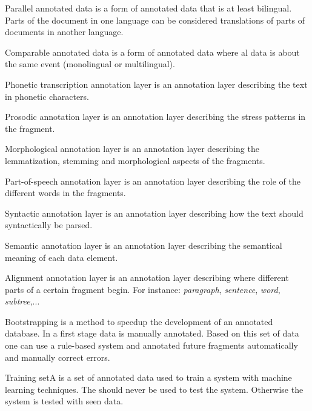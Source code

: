 \begin{df}{Parallel annotated data}\sb{} is a form of annotated data that is at least bilingual. Parts of the document in one language can be considered translations of parts of documents in another language.
\end{df}
\begin{df}{Comparable annotated data}\sb{} is a form of annotated data where al data is about the same event (monolingual or multilingual).
\end{df}
\begin{df}{Phonetic transcription annotation layer}\sb{} is an annotation layer describing the text in phonetic characters.
\end{df}
\begin{df}{Prosodic annotation layer}\sb{} is an annotation layer describing the stress patterns in the fragment.
\end{df}
\begin{df}{Morphological annotation layer}\sb{} is an annotation layer describing the lemmatization, stemming and morphological aspects of the fragments.
\end{df}
\begin{df}{Part-of-speech annotation layer}\sb{} is an annotation layer describing the role of the different words in the fragments.
\end{df}
\begin{df}{Syntactic annotation layer}\sb{} is an annotation layer describing how the text should syntactically be parsed.
\end{df}
\begin{df}{Semantic annotation layer}\sb{} is an annotation layer describing the semantical meaning of each data element.
\end{df}
\begin{df}{Alignment annotation layer}\sb{} is an annotation layer describing where different parts of a certain fragment begin. For instance: \emph{paragraph}, \emph{sentence}, \emph{word}, \emph{subtree},...
\end{df}
\begin{df}{Bootstrapping}\sb{} is a method to speedup the development of an annotated database. In a first stage data is manually annotated. Based on this set of data one can use a rule-based system and annotated future fragments automatically and manually correct errors.
\end{df}
\begin{df}{Training set}A \sb{} is a set of annotated data used to train a system with machine learning techniques. The \sb{} should never be used to test the system. Otherwise the system is tested with seen data.
\end{df}
